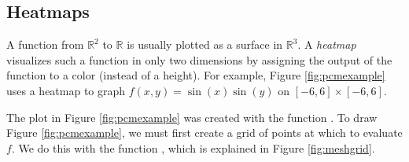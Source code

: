 \subsection*{Heatmaps}
A function from $\mathbb{R}^2$ to $\mathbb{R}$ is usually plotted as a surface in $\mathbb{R}^3$.
A \emph{heatmap} visualizes such a function in only two dimensions by assigning the output of the function to a color (instead of a height).
For example, Figure \ref{fig:pcmexample} uses a heatmap to graph $f(x,y) = \sin(x)\sin(y)$ on $[-6,6] \times [-6,6]$.

The plot in Figure \ref{fig:pcmexample} was created with the function .
To draw Figure \ref{fig:pcmexample}, we must first create a grid of points at which to evaluate $f$.
We do this with the function , which is explained in Figure \ref{fig:meshgrid}.

